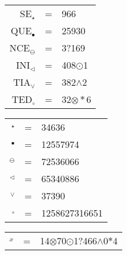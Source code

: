 \documentclass{article}
\begin{document}
{\LARGE
\begin{center}
\begin{tabular}{rcl}
 SE$_\star$ & =& 966\\
 QUE$_\bullet$ & =& 25930\\
 NCE$_\ominus$ & =& 3?169\\
 INI$_\triangleleft$ & =& 408$\odot$1\\
 TIA$_\vee$ & =& 382$\wedge$2\\
 TED$_\circ$ & =& 32$\otimes\ast$6\\
\end{tabular}
\end{center}
\vspace{1cm}
\begin{center}
\begin{tabular}{rcl}
\underline{\hspace{3cm}}$_\star$ & =& 34636 \\
\underline{\hspace{3cm}}$_\bullet$ & =& 12557974 \\ 
\underline{\hspace{3cm}}$_\ominus$ & =& 72536066 \\ 
\underline{\hspace{3cm}}$_\triangleleft$ & =& 65340886 \\ 
\underline{\hspace{3cm}}$_\vee$ & =& 37390 \\ 
\underline{\hspace{3cm}}$_\circ$ & =& 1258627316651 \\ 
\end{tabular}
\end{center}
\vspace{1cm}
\begin{center}
\begin{tabular}{rcl}
\underline{\hspace{4cm}}$_x$&=&
 14\(\otimes\)70\(\odot\)1?466\(\wedge\)0\(\ast\)4
\end{tabular}
\end{center}
}
\end{document}
